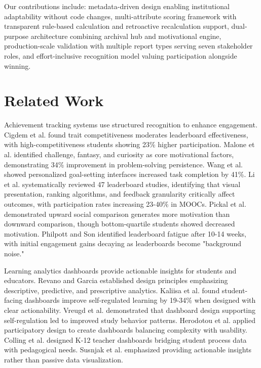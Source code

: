 \documentclass[12pt]{article}
\begin{document}
Our contributions include: metadata-driven design enabling institutional adaptability without code changes, multi-attribute scoring framework with transparent rule-based calculation and retroactive recalculation support, dual-purpose architecture combining archival hub and motivational engine, production-scale validation with multiple report types serving seven stakeholder roles, and effort-inclusive recognition model valuing participation alongside winning.

\section{Related Work}

Achievement tracking systems use structured recognition to enhance engagement. Cigdem et al. \cite{cigdem2024} found trait competitiveness moderates leaderboard effectiveness, with high-competitiveness students showing 23\% higher participation. Malone et al. \cite{malone2021} identified challenge, fantasy, and curiosity as core motivational factors, demonstrating 34\% improvement in problem-solving persistence. Wang et al. \cite{wang2025} showed personalized goal-setting interfaces increased task completion by 41\%. Li et al. \cite{li2024} systematically reviewed 47 leaderboard studies, identifying that visual presentation, ranking algorithms, and feedback granularity critically affect outcomes, with participation rates increasing 23-40\% in MOOCs. Pickal et al. \cite{pickal2026} demonstrated upward social comparison generates more motivation than downward comparison, though bottom-quartile students showed decreased motivation. Philpott and Son \cite{philpott2022} identified leaderboard fatigue after 10-14 weeks, with initial engagement gains decaying as leaderboards become "background noise."

Learning analytics dashboards provide actionable insights for students and educators. Revano and Garcia \cite{revano2021} established design principles emphasizing descriptive, predictive, and prescriptive analytics. Kaliisa et al. \cite{kaliisa2024} found student-facing dashboards improve self-regulated learning by 19-34\% when designed with clear actionability. Vreugd et al. \cite{vreugd2024} demonstrated that dashboard design supporting self-regulation led to improved study behavior patterns. Herodotou et al. \cite{herodotou2025} applied participatory design to create dashboards balancing complexity with usability. Colling et al. \cite{colling2024} designed K-12 teacher dashboards bridging student process data with pedagogical needs. Susnjak et al. \cite{susnjak2022} emphasized providing actionable insights rather than passive data visualization.
\end{document}
